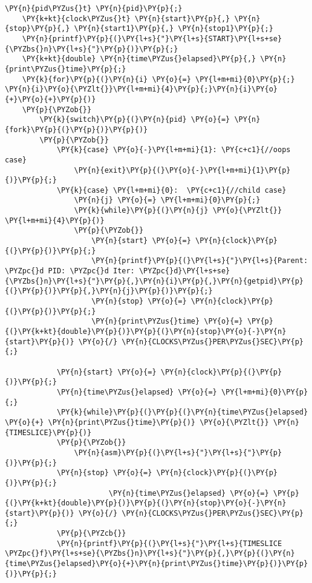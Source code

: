 \begin{Verbatim}[commandchars=\\\{\}]
    \PY{n}{pid\PYZus{}t} \PY{n}{pid}\PY{p}{;}
    \PY{k+kt}{clock\PYZus{}t} \PY{n}{start}\PY{p}{,} \PY{n}{stop}\PY{p}{,} \PY{n}{start1}\PY{p}{,} \PY{n}{stop1}\PY{p}{;}
    \PY{n}{printf}\PY{p}{(}\PY{l+s}{"}\PY{l+s}{START}\PY{l+s+se}{\PYZbs{}n}\PY{l+s}{"}\PY{p}{)}\PY{p}{;}
    \PY{k+kt}{double} \PY{n}{time\PYZus{}elapsed}\PY{p}{,} \PY{n}{print\PYZus{}time}\PY{p}{;}
    \PY{k}{for}\PY{p}{(}\PY{n}{i} \PY{o}{=} \PY{l+m+mi}{0}\PY{p}{;} \PY{n}{i}\PY{o}{\PYZlt{}}\PY{l+m+mi}{4}\PY{p}{;}\PY{n}{i}\PY{o}{+}\PY{o}{+}\PY{p}{)}
    \PY{p}{\PYZob{}}
        \PY{k}{switch}\PY{p}{(}\PY{n}{pid} \PY{o}{=} \PY{n}{fork}\PY{p}{(}\PY{p}{)}\PY{p}{)}
        \PY{p}{\PYZob{}}
            \PY{k}{case} \PY{o}{-}\PY{l+m+mi}{1}: \PY{c+c1}{//oops case}
                \PY{n}{exit}\PY{p}{(}\PY{o}{-}\PY{l+m+mi}{1}\PY{p}{)}\PY{p}{;}
            \PY{k}{case} \PY{l+m+mi}{0}:  \PY{c+c1}{//child case}
                \PY{n}{j} \PY{o}{=} \PY{l+m+mi}{0}\PY{p}{;}
                \PY{k}{while}\PY{p}{(}\PY{n}{j} \PY{o}{\PYZlt{}} \PY{l+m+mi}{4}\PY{p}{)}
                \PY{p}{\PYZob{}}
                    \PY{n}{start} \PY{o}{=} \PY{n}{clock}\PY{p}{(}\PY{p}{)}\PY{p}{;}
                    \PY{n}{printf}\PY{p}{(}\PY{l+s}{"}\PY{l+s}{Parent: \PYZpc{}d PID: \PYZpc{}d Iter: \PYZpc{}d}\PY{l+s+se}{\PYZbs{}n}\PY{l+s}{"}\PY{p}{,}\PY{n}{i}\PY{p}{,}\PY{n}{getpid}\PY{p}{(}\PY{p}{)}\PY{p}{,}\PY{n}{j}\PY{p}{)}\PY{p}{;}
                    \PY{n}{stop} \PY{o}{=} \PY{n}{clock}\PY{p}{(}\PY{p}{)}\PY{p}{;}
                    \PY{n}{print\PYZus{}time} \PY{o}{=} \PY{p}{(}\PY{k+kt}{double}\PY{p}{)}\PY{p}{(}\PY{n}{stop}\PY{o}{-}\PY{n}{start}\PY{p}{)} \PY{o}{/} \PY{n}{CLOCKS\PYZus{}PER\PYZus{}SEC}\PY{p}{;}

            \PY{n}{start} \PY{o}{=} \PY{n}{clock}\PY{p}{(}\PY{p}{)}\PY{p}{;}
            \PY{n}{time\PYZus{}elapsed} \PY{o}{=} \PY{l+m+mi}{0}\PY{p}{;}
            \PY{k}{while}\PY{p}{(}\PY{p}{(}\PY{n}{time\PYZus{}elapsed} \PY{o}{+} \PY{n}{print\PYZus{}time}\PY{p}{)} \PY{o}{\PYZlt{}} \PY{n}{TIMESLICE}\PY{p}{)}
            \PY{p}{\PYZob{}}
                \PY{n}{asm}\PY{p}{(}\PY{l+s}{"}\PY{l+s}{"}\PY{p}{)}\PY{p}{;}
            \PY{n}{stop} \PY{o}{=} \PY{n}{clock}\PY{p}{(}\PY{p}{)}\PY{p}{;}
                        \PY{n}{time\PYZus{}elapsed} \PY{o}{=} \PY{p}{(}\PY{k+kt}{double}\PY{p}{)}\PY{p}{(}\PY{n}{stop}\PY{o}{-}\PY{n}{start}\PY{p}{)} \PY{o}{/} \PY{n}{CLOCKS\PYZus{}PER\PYZus{}SEC}\PY{p}{;}
            \PY{p}{\PYZcb{}}
            \PY{n}{printf}\PY{p}{(}\PY{l+s}{"}\PY{l+s}{TIMESLICE \PYZpc{}f}\PY{l+s+se}{\PYZbs{}n}\PY{l+s}{"}\PY{p}{,}\PY{p}{(}\PY{n}{time\PYZus{}elapsed}\PY{o}{+}\PY{n}{print\PYZus{}time}\PY{p}{)}\PY{p}{)}\PY{p}{;}


\end{Verbatim}
